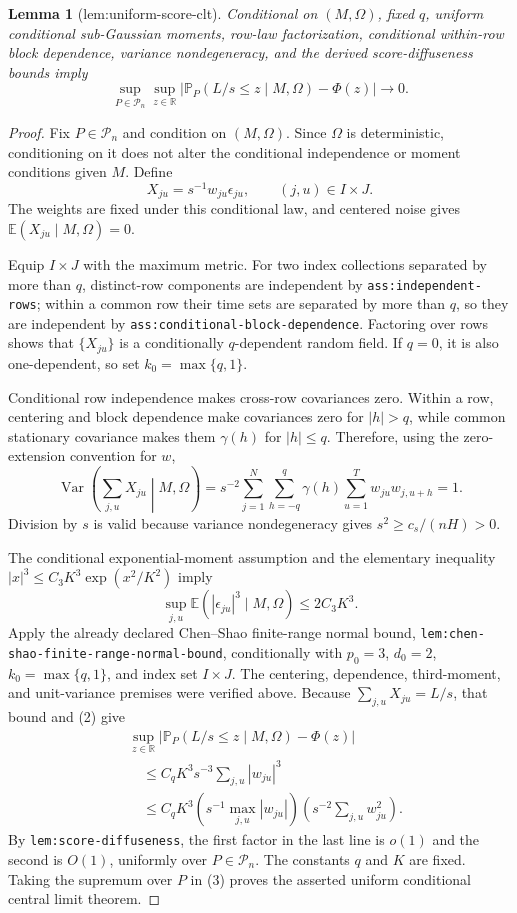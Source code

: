 \documentclass{article}
\newtheorem{lemma}{Lemma}
\begin{document}
\begin{lemma}[lem:uniform-score-clt]\label{lem:uniform-score-clt}
Conditional on \((M,\Omega)\), fixed \(q\), uniform conditional sub-Gaussian moments, row-law factorization, conditional within-row block dependence, variance nondegeneracy, and the derived score-diffuseness bounds imply
\[
 \sup_{P\in\mathcal P_n}\sup_{z\in\mathbb R}
 \left|\mathbb P_P(L/s\le z\mid M,\Omega)-\Phi(z)\right|\longrightarrow0.
\]
\end{lemma}
\begin{proof}
Fix \(P\in\mathcal P_n\) and condition on \((M,\Omega)\).  Since \(\Omega\) is deterministic, conditioning on it does not alter the conditional independence or moment conditions given \(M\).  Define
\[
 X_{ju}=s^{-1}w_{ju}\epsilon_{ju},
 \qquad (j,u)\in I\times J.
\]
The weights are fixed under this conditional law, and centered noise gives \(\mathbb E(X_{ju}\mid M,\Omega)=0\).

Equip \(I\times J\) with the maximum metric.  For two index collections separated by more than \(q\), distinct-row components are independent by \texttt{ass:independent-rows}; within a common row their time sets are separated by more than \(q\), so they are independent by \texttt{ass:conditional-block-dependence}.  Factoring over rows shows that \(\{X_{ju}\}\) is a conditionally \(q\)-dependent random field.  If \(q=0\), it is also one-dependent, so set \(k_0=\max\{q,1\}\).

Conditional row independence makes cross-row covariances zero.  Within a row, centering and block dependence make covariances zero for \(|h|>q\), while common stationary covariance makes them \(\gamma(h)\) for \(|h|\le q\).  Therefore, using the zero-extension convention for \(w\),
\[
 \operatorname{Var}\!\left(\sum_{j,u}X_{ju}\middle|M,\Omega\right)
 =s^{-2}\sum_{j=1}^N\sum_{h=-q}^q\gamma(h)
    \sum_{u=1}^Tw_{ju}w_{j,u+h}=1.
 \tag{1}
\]
Division by \(s\) is valid because variance nondegeneracy gives \(s^2\ge c_s/(nH)>0\).

The conditional exponential-moment assumption and the elementary inequality \(|x|^3\le C_3K^3\exp(x^2/K^2)\) imply
\[
 \sup_{j,u}\mathbb E(|\epsilon_{ju}|^3\mid M,\Omega)
 \le 2C_3K^3.
 \tag{2}
\]
Apply the already declared Chen--Shao finite-range normal bound, \texttt{lem:chen-shao-finite-range-normal-bound}, conditionally with \(p_0=3\), \(d_0=2\), \(k_0=\max\{q,1\}\), and index set \(I\times J\).  The centering, dependence, third-moment, and unit-variance premises were verified above.  Because \(\sum_{j,u}X_{ju}=L/s\), that bound and (2) give
\[
 \begin{aligned}
 &\sup_{z\in\mathbb R}
 \left|\mathbb P_P(L/s\le z\mid M,\Omega)-\Phi(z)\right|\\
 &\quad\le C_qK^3s^{-3}\sum_{j,u}|w_{ju}|^3\\
 &\quad\le C_qK^3
 \left(s^{-1}\max_{j,u}|w_{ju}|\right)
 \left(s^{-2}\sum_{j,u}w_{ju}^2\right).
 \end{aligned}
 \tag{3}
\]
By \texttt{lem:score-diffuseness}, the first factor in the last line is \(o(1)\) and the second is \(O(1)\), uniformly over \(P\in\mathcal P_n\).  The constants \(q\) and \(K\) are fixed.  Taking the supremum over \(P\) in (3) proves the asserted uniform conditional central limit theorem.
\end{proof}
\end{document}
